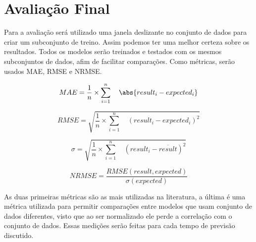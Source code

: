 \section{Avaliação Final}





Para a avaliação será utilizado uma janela deslizante no conjunto de dados para criar um subconjunto de treino. Assim podemos ter uma melhor certeza sobre os resultados. Todos os modelos serão treinados e testados com os mesmos subconjuntos de dados, afim de facilitar comparações. Como métricas, serão usados MAE, RMSE e NRMSE. 

\begin{equation}
MAE = \frac{1}{n} \times \sum_{i=1}^{n} \quad \abs{result_i - expected_i}
\end{equation}

\begin{equation}
RMSE = \sqrt{ \frac{1}{n} \times \sum_{i=1}^{n} \quad (result_i - expected_i) ^ 2}
\end{equation}

\begin{equation}
\sigma = \sqrt{ \frac{1}{n} \times \sum_{i=1}^{n} \quad (result_i - \overline{result}) ^ 2}
\end{equation}

\begin{equation}
NRMSE = \frac{RMSE(result, expected)}{\sigma(expected)}
\end{equation}

As duas primeiras métricas são as mais utilizadas na literatura, a última é uma métrica utilizada para permitir comparações entre modelos que usam conjunto de dados diferentes, visto que ao ser normalizado ele perde a correlação com o conjunto de dados. Essas medições serão feitas para cada tempo de previsão discutido.
